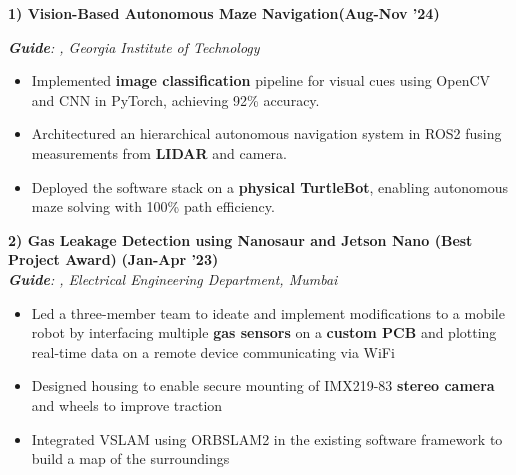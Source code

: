 \documentclass[10pt,letterpaper,sans]{moderncv}        %
\newcommand\x{1}
\newcommand\y{4}
\begin{document}

\textbf{1) Vision-Based Autonomous Maze Navigation}\hfill{\textbf{(Aug-Nov '24)}}

\textit{\textbf{Guide}: , Georgia Institute of Technology} 

\vspace{\x pt}
\begin{itemize}
    \item Implemented \textbf{image classification} pipeline for visual cues using OpenCV and CNN in PyTorch, achieving 92\% accuracy.
    \item Architectured an hierarchical autonomous navigation system in ROS2 fusing measurements from \textbf{LIDAR} and camera.
    \item Deployed the software stack on a \textbf{physical TurtleBot}, enabling autonomous maze solving with 100\% path efficiency.
\end{itemize}
\hrulefill{}
\vspace{\y pt}


\textbf{2) Gas Leakage Detection
using Nanosaur and Jetson Nano (Best Project Award)} \hfill{\textbf{(Jan-Apr '23)}} \\ 
{\textit{\textbf{Guide}: , Electrical Engineering Department, Mumbai}} 


\begin{itemize}
    \item Led a three-member team to ideate and implement modifications to a mobile robot by interfacing multiple \textbf{gas sensors} on a \textbf{custom PCB} and plotting real-time data on a remote device communicating via WiFi
    \item Designed housing to enable secure mounting of IMX219-83 \textbf{stereo camera} and wheels to improve traction
    \item Integrated VSLAM using ORBSLAM2 in the existing software framework to build a map of the surroundings
\end{itemize} 
\end{document}
